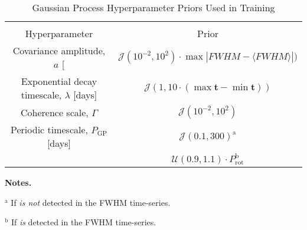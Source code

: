 \begin{table*}
  \small
  \renewcommand{\arraystretch}{0.7}
  \caption{Gaussian Process Hyperparameter Priors Used in Training}
  \label{BStable:gppriors}
  \begin{tabular}{cc}
    \hline \\ [-1ex]
    Hyperparameter & Prior \\
    \hline
    Covariance amplitude, $a$ [\mps{]} & $\mathcal{J}(10^{-2}, 10^2) \cdot \max{|FWHM-\langle FWHM \rangle|})$ \\
    Exponential decay timescale, $\lambda$ [days] & $\mathcal{J}(1, 10\cdot (\max{\mathbf{t}}-\min{\mathbf{t}}))$  \\
    Coherence scale, $\Gamma$ & $\mathcal{J}(10^{-2}, 10^2)$ \\
    Periodic timescale, $P_{\text{GP}}$ [days] & $\mathcal{J}(0.1,300)^{\text{a}}$ \\
    & $\mathcal{U}(0.9, 1.1) \cdot P_{\text{rot}}^{\text{b}}$
  \end{tabular}
  \begin{list}{}{}
  \item {\bf{Notes.}}
  \item $^{\text{a}}$ If \prot{} \emph{is not} detected in the FWHM time-series.
  \item $^{\text{b}}$ If \prot{} \emph{is} detected in the FWHM time-series.
  \end{list}
\end{table*}
